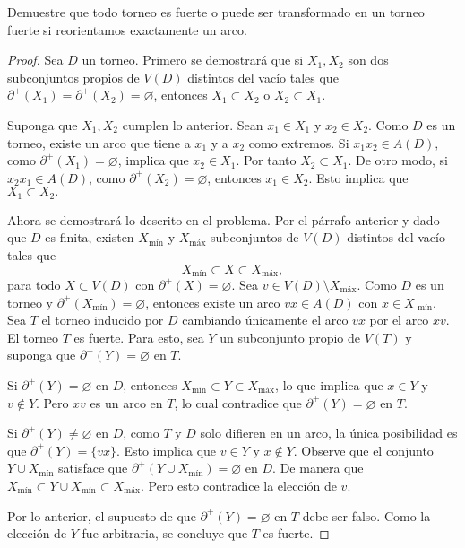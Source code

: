 \documentclass[12pt]{article}
\newenvironment{problem}[2][Problema]{\begin{trivlist}
\item[\hskip \labelsep {\bfseries #1}\hskip \labelsep {\bfseries #2.}]}{\end{trivlist}}
\begin{document}
\begin{problem}{3.4.5}
Demuestre que todo torneo es fuerte o puede ser transformado en un torneo fuerte si reorientamos exactamente un arco.
\end{problem}
\begin{proof}
Sea $D$ un torneo. Primero se demostrará que si $X_1, X_2$ son dos subconjuntos propios de $V(D)$ distintos del vacío tales que $\partial^+(X_1) = \partial^+(X_2) = \varnothing$, entonces $X_1 \subset X_2$ o $X_2 \subset X_1$.

Suponga que $X_1, X_2$ cumplen lo anterior. Sean $x_1 \in X_1$ y $x_2 \in X_2$. Como $D$ es un torneo, existe un arco que tiene a $x_1$ y a $x_2$ como extremos. Si $x_1 x_2 \in A(D),$ como $\partial^+(X_1) = \varnothing$, implica que $x_2 \in X_1$. Por tanto $X_2 \subset X_1.$ De otro modo, si $x_2 x_1 \in A(D)$, como $\partial^+(X_2) = \varnothing$, entonces $x_1 \in X_2$. Esto implica que $X_1 \subset X_2.$

Ahora se demostrará lo descrito en el problema. Por el párrafo anterior y dado que $D$ es finita, existen $X_{\text{mín}}$ y $X_{\text{máx}}$ subconjuntos de $V(D)$ distintos del vacío tales que 
$$X_{\text{mín}} \subset X \subset X_{\text{máx}},$$
para todo $X \subset V(D)$ con $\partial^+(X) = \varnothing.$ Sea $v \in V(D) \setminus X_{\text{máx}}$. Como $D$ es un torneo y $\partial^+(X_{\text{mín}}) = \varnothing$, entonces existe un arco $v x \in A(D)$ con $x \in X_{\text{ mín}}$. Sea $T$ el torneo inducido por $D$ cambiando únicamente el arco $vx$ por el arco $xv$. El torneo $T$ es fuerte. Para esto, sea $Y$ un subconjunto propio de $V(T)$ y  suponga que $\partial^+(Y) = \varnothing$ en $T.$ 

Si $\partial^+(Y) = \varnothing $ en $D$, entonces $X_{\text{mín}} \subset Y \subset X_{\text{máx}}$, lo que implica que $x \in Y$ y $v \notin Y$. Pero $xv$ es un arco en $T$, lo cual contradice que $\partial^+(Y) = \varnothing$ en $T.$ 

Si $\partial^+(Y) \neq \varnothing$ en $D$, como $T$ y $D$ solo difieren en un arco, la única posibilidad es que $\partial^+(Y) = \{vx\}$. Esto implica que $v \in Y$ y $x \notin Y.$ Observe que el conjunto $Y \cup X_{\text{mín}}$ satisface que $\partial^+(Y \cup X_{\text{mín}}) = \varnothing$ en $D$. De manera que $X_{\text{mín}} \subset Y \cup X_{\text{mín}} \subset X_{\text{máx}}$. Pero esto contradice la elección de $v.$

Por lo anterior, el supuesto de que $\partial^+(Y) = \varnothing$ en $T$ debe ser falso. Como la elección de $Y$ fue arbitraria, se concluye que $T$ es fuerte.

\end{proof}
\end{document}
